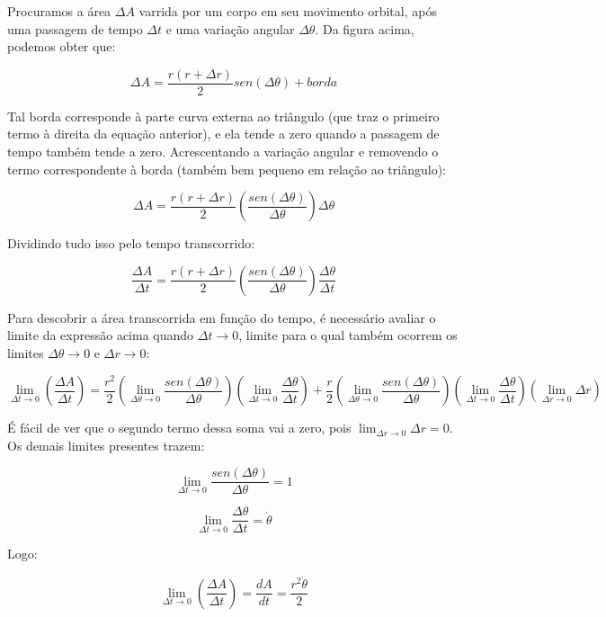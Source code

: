 Procuramos a área $\Delta A$ varrida por um corpo em seu movimento orbital, após uma passagem de tempo $\Delta t$ e uma variação angular $\Delta \theta$. Da figura acima, podemos obter que:

\begin{equation}
	\Delta A = \frac{r(r+\Delta r)}{2}sen(\Delta \theta) + borda\label{eq57}
\end{equation}

Tal borda corresponde à parte curva externa ao triângulo (que traz o primeiro termo à direita da equação anterior), e ela tende a zero quando a passagem de tempo também tende a zero. Acrescentando a variação angular e removendo o termo correspondente à borda (também bem pequeno em relação ao triângulo):

\[
	\Delta A = \frac{r(r+\Delta r)}{2}\left(\frac{sen(\Delta \theta)}{\Delta \theta}\right)\Delta \theta
\]

Dividindo tudo isso pelo tempo transcorrido:

\[
    \frac{\Delta A}{\Delta t} = \frac{r(r+\Delta r)}{2}\left(\frac{sen(\Delta \theta)}{\Delta \theta}\right)\frac{\Delta \theta}{\Delta t}
\]

Para descobrir a área transcorrida em função do tempo, é necessário avaliar o limite da expressão acima quando $\Delta t \rightarrow 0$, limite para o qual também ocorrem os limites $\Delta \theta \rightarrow 0$ e $\Delta r \rightarrow 0$:

\[
	 \lim_{\Delta t \rightarrow 0}\left({\frac{\Delta A}{\Delta t}}\right) = \frac{r^2}{2}\left(\lim_{\Delta \theta \rightarrow 0}{\frac{sen(\Delta \theta)}{\Delta \theta}}\right)\left(\lim_{\Delta t \rightarrow 0}{\frac{\Delta \theta}{\Delta t}}\right) + \frac{r}{2}\left(\lim_{\Delta \theta \rightarrow 0}{\frac{sen(\Delta \theta)}{\Delta \theta}}\right)\left(\lim_{\Delta t \rightarrow 0}{\frac{\Delta \theta}{\Delta t}}\right)\left(\lim_{\Delta r \rightarrow 0}{\Delta r}\right) 
\]

É fácil de ver que o segundo termo dessa soma vai a zero, pois $\lim_{\Delta r \rightarrow 0}{\Delta r} = 0$. Os demais limites presentes trazem:

\[
	\lim_{\Delta t \rightarrow 0}{\frac{sen(\Delta \theta)}{\Delta \theta}} = 1
\]

\[
	\lim_{\Delta t \rightarrow 0}{\frac{\Delta \theta}{\Delta t}} = \dot{\theta}
\]

Logo:

\[
	\lim_{\Delta t \rightarrow 0}\left({\frac{\Delta A}{\Delta t}}\right) = \frac{dA}{dt} = \frac{r^2\dot{\theta}}{2}
\]

